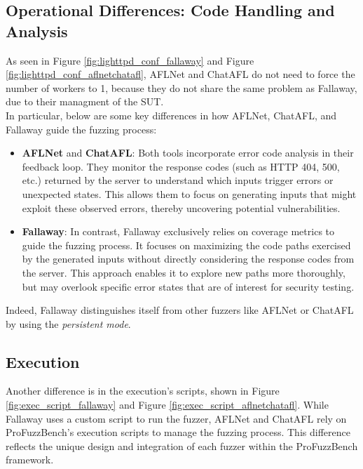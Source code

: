 \subsection{Operational Differences: Code Handling and Analysis}
As seen in Figure \ref{fig:lighttpd_conf_fallaway} and Figure \ref{fig:lighttpd_conf_aflnetchatafl}, AFLNet and ChatAFL do not need to force the number of workers to 1, because they do not share the same problem as Fallaway, due to their managment of the SUT.
\\In particular, below are some key differences in how AFLNet, ChatAFL, and Fallaway guide the fuzzing process:

\begin{itemize}
    \item \textbf{AFLNet} and \textbf{ChatAFL}: Both tools incorporate error code analysis in their feedback loop. They monitor the response codes (such as HTTP 404, 500, etc.) returned by the server to understand which inputs trigger errors or unexpected states. This allows them to focus on generating inputs that might exploit these observed errors, thereby uncovering potential vulnerabilities.
    \item \textbf{Fallaway}: In contrast, Fallaway exclusively relies on coverage metrics to guide the fuzzing process. It focuses on maximizing the code paths exercised by the generated inputs without directly considering the response codes from the server. This approach enables it to explore new paths more thoroughly, but may overlook specific error states that are of interest for security testing.
\end{itemize}
Indeed, Fallaway distinguishes itself from other fuzzers like AFLNet or ChatAFL by using the \textit{persistent mode}.

\subsection{Execution}
Another difference is in the execution's scripts, shown in Figure \ref{fig:exec_script_fallaway} and Figure \ref{fig:exec_script_aflnetchatafl}.
While Fallaway uses a custom script to run the fuzzer, AFLNet and ChatAFL rely on ProFuzzBench's execution scripts to manage the fuzzing process. This difference reflects the unique design and integration of each fuzzer within the ProFuzzBench framework.

